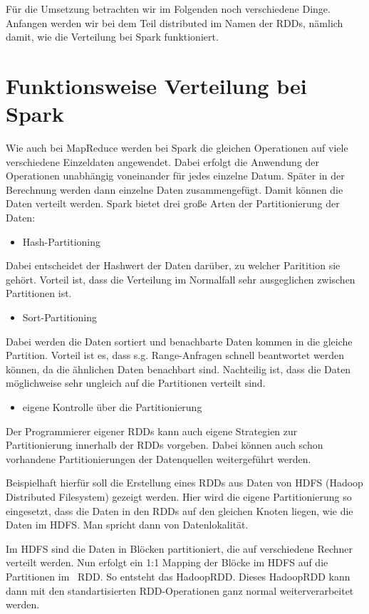 Für die Umsetzung betrachten wir im Folgenden noch verschiedene Dinge.
Anfangen werden wir bei dem Teil distributed im Namen der RDDs, nämlich
damit, wie die Verteilung bei Spark funktioniert.

\section[Funktionsweise Verteilung bei
Spark]{\rmfamily Funktionsweise Verteilung bei
Spark}
Wie auch bei MapReduce werden bei Spark die gleichen Operationen auf
viele verschiedene Einzeldaten angewendet. Dabei erfolgt die Anwendung
der Operationen unabhängig voneinander für jedes einzelne Datum. Später
in der Berechnung werden dann einzelne Daten zusammengefügt. Damit
können die Daten verteilt werden. Spark bietet drei große Arten der
Partitionierung der Daten:

\begin{itemize}
\item Hash-Partitioning
\end{itemize}
Dabei entscheidet der Hashwert der Daten darüber, zu welcher Paritition
sie gehört. Vorteil ist, dass die Verteilung im Normalfall sehr
ausgeglichen zwischen Partitionen ist.

\begin{itemize}
\item Sort-Partitioning
\end{itemize}
Dabei werden die Daten sortiert und benachbarte Daten kommen in die
gleiche Partition. Vorteil ist es, dass s.g. Range-Anfragen schnell
beantwortet werden können, da die ähnlichen Daten benachbart sind.
Nachteilig ist, dass die Daten möglichweise sehr ungleich auf die
Partitionen verteilt sind.

\begin{itemize}
\item eigene Kontrolle über die Partitionierung
\end{itemize}
Der Programmierer eigener RDDs kann auch eigene Strategien zur
Partitionierung innerhalb der RDDs vorgeben. Dabei können auch schon
vorhandene Partitionierungen der Datenquellen weitergeführt werden.

Beispielhaft hierfür soll die Erstellung eines RDDs aus Daten von HDFS
(Hadoop Distributed Filesystem) gezeigt werden. Hier wird die eigene
Partitionierung so eingesetzt, dass die Daten in den RDDs auf den
gleichen Knoten liegen, wie die Daten im HDFS. Man spricht dann von
Datenlokalität.

Im HDFS sind die Daten in Blöcken partitioniert, die auf verschiedene
Rechner verteilt werden. Nun erfolgt ein 1:1 Mapping der Blöcke im HDFS
auf die Partitionen im \ RDD. So entsteht das HadoopRDD. Dieses
HadoopRDD kann dann mit den standartisierten RDD-Operationen ganz
normal weiterverarbeitet werden.

